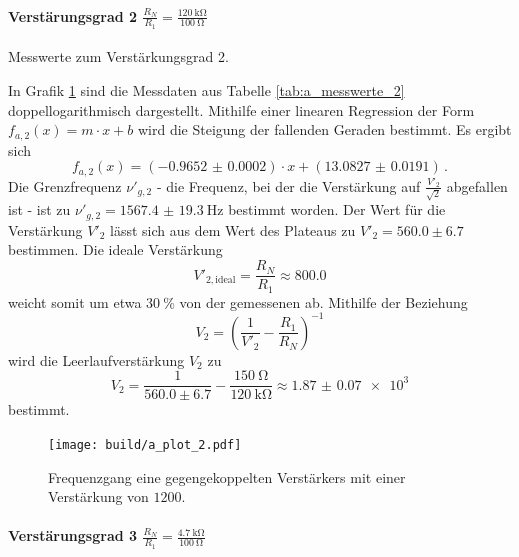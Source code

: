 \paragraph{Verstärungsgrad 2 $\frac{R_N}{R_1} = \frac{\SI{120}{\kilo\ohm}}{\SI{100}{\ohm}}$}

\begin{table}
\centering
\caption{Messwerte zum Verstärkungsgrad 2.}
    \label{tab:a_messwerte_2}
    
\end{table}

In Grafik \ref{fig:a_plot_2} sind die Messdaten aus Tabelle \ref{tab:a_messwerte_2} doppellogarithmisch dargestellt.
Mithilfe einer linearen Regression der Form $f_{a,2}(x)= m \cdot x + b$ wird die Steigung der fallenden Geraden bestimmt.
Es ergibt sich
\begin{equation*}
	f_{a,2}(x) = (\num{-0.9652(2)}) \cdot x + (\num{13.0827(191)})\,.
\end{equation*}
Die Grenzfrequenz $\nu'_{g,2}$ - die Frequenz, bei der die Verstärkung auf $\frac{V'_2}{\sqrt{2}}$ abgefallen ist - ist zu $\nu'_{g,2} = \SI{1567.4(193)}{\hertz}$ bestimmt worden.
Der Wert für die Verstärkung $V'_2$ lässt sich aus dem Wert des Plateaus zu $V'_2=560.0\pm6.7$ bestimmen.
Die ideale Verstärkung 
\begin{equation*}
    V'_{2,\text{ideal}} = \frac{R_N}{R_1} \approx 800.0
\end{equation*}
weicht somit um etwa $\SI{30}{\percent}$ von der gemessenen ab.
Mithilfe der Beziehung
\begin{equation*}
    V_2 = \left( \frac{1}{V'_2} - \frac{R_1}{R_N} \right) ^{-1}
\end{equation*}
wird die Leerlaufverstärkung $V_2$ zu
\begin{equation*}
	V_2 = \frac{1}{560.0\pm6.7} - \frac{\SI{150}{\ohm}}{\SI{120}{\kilo\ohm}} \approx 
    \num{1.87(7)e3}
\end{equation*}
bestimmt.

\begin{figure}[h!]
    \centering
    \texttt{[image: build/a\_plot\_2.pdf]}
    \caption{Frequenzgang eine gegengekoppelten Verstärkers mit einer Verstärkung von $1200$.}
    \label{fig:a_plot_2}
\end{figure}

\paragraph{Verstärungsgrad 3 $\frac{R_N}{R_1} = \frac{\SI{4.7}{\kilo\ohm}}{\SI{100}{\ohm}}$}

